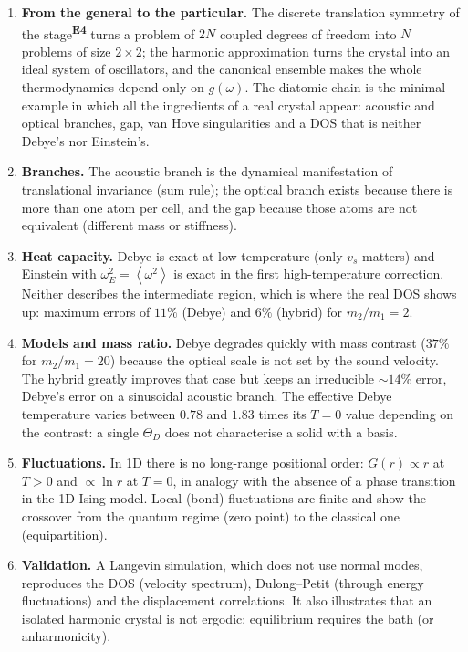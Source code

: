 \documentclass[11pt,a4paper]{article}
\newcommand{\Eesc}{stage\textsuperscript{\textcolor{eesc}{\textbf{E4}}}}
\newcommand{\avg}[1]{\left\langle #1\right\rangle}
\newcommand{\vs}{v_{s}}
\begin{document}
\begin{enumerate}
\item \textbf{From the general to the particular.} The discrete translation
  symmetry of the \Eesc{} turns a problem of $2N$ coupled degrees of freedom
  into $N$ problems of size $2\times2$; the harmonic approximation turns the
  crystal into an ideal system of oscillators, and the canonical ensemble makes
  the whole thermodynamics depend only on $g(\omega)$. The diatomic chain is the
  minimal example in which all the ingredients of a real crystal appear:
  acoustic and optical branches, gap, van Hove singularities and a DOS that is
  neither Debye's nor Einstein's.
\item \textbf{Branches.} The acoustic branch is the dynamical manifestation of
  translational invariance (sum rule); the optical branch exists because there is
  more than one atom per cell, and the gap because those atoms are not
  equivalent (different mass or stiffness).
\item \textbf{Heat capacity.} Debye is exact at low temperature (only $\vs$
  matters) and Einstein with $\omega_E^2=\avg{\omega^2}$ is exact in the first
  high-temperature correction. Neither describes the intermediate region, which
  is where the real DOS shows up: maximum errors of $11\%$ (Debye) and $6\%$
  (hybrid) for $m_2/m_1=2$.
\item \textbf{Models and mass ratio.} Debye degrades quickly with mass contrast
  ($37\%$ for $m_2/m_1=20$) because the optical scale is not set by the sound
  velocity. The hybrid greatly improves that case but keeps an irreducible
  $\sim14\%$ error, Debye's error on a sinusoidal acoustic branch. The effective
  Debye temperature varies between $0.78$ and $1.83$ times its $T=0$ value
  depending on the contrast: a single $\Theta_D$ does not characterise a solid
  with a basis.
\item \textbf{Fluctuations.} In 1D there is no long-range positional order:
  $G(r)\propto r$ at $T>0$ and $\propto\ln r$ at $T=0$, in analogy with the
  absence of a phase transition in the 1D Ising model. Local (bond) fluctuations
  are finite and show the crossover from the quantum regime (zero point) to the
  classical one (equipartition).
\item \textbf{Validation.} A Langevin simulation, which does not use normal
  modes, reproduces the DOS (velocity spectrum), Dulong–Petit (through energy
  fluctuations) and the displacement correlations. It also illustrates that an
  isolated harmonic crystal is not ergodic: equilibrium requires the bath (or
  anharmonicity).
\end{enumerate}
\end{document}
